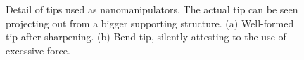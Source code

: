 		\begin{figure}[htp]
			\begin{subfigure}[t]{ 0.49\linewidth}
				\centering
				\caption{}
				\label{subfig::nanomanipulator_tip}
			\end{subfigure}
			\hfill
			\begin{subfigure}[t]{ 0.49\linewidth}
				\centering
				\caption{}
				\label{subfig::nanomanipulator_tip_bent}
			\end{subfigure}
			\caption[Detail of nanomanipulator tips]{Detail of tips used as nanomanipulators. The actual tip can be seen projecting out from a bigger supporting structure. (a) Well-formed tip after sharpening. (b) Bend tip, silently attesting to the use of excessive force.}
		\end{figure}

